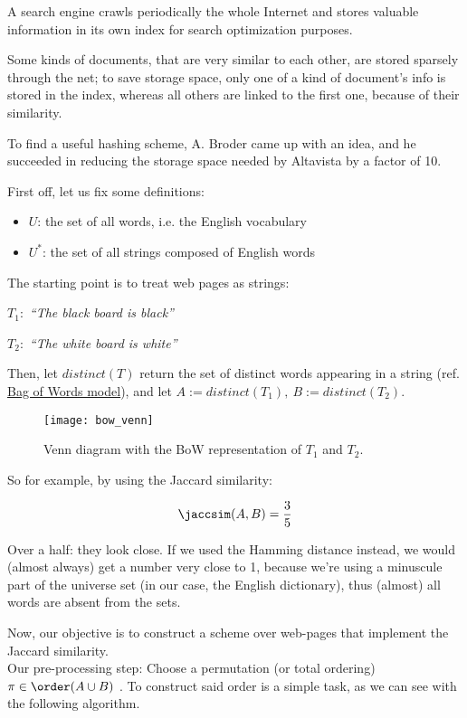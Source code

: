 A search engine crawls periodically the whole Internet and stores valuable information in its own index for search optimization purposes.

\begin{obs}
	Some kinds of documents, that are very similar to each other, are stored sparsely through the net; to save storage space, only one of a kind of document's info is stored in the index, whereas all others are linked to the first one, because of their similarity.
\end{obs}

To find a useful hashing scheme, A. Broder came up with an idea, and he succeeded in reducing the storage space needed by Altavista by a factor of 10.

First off, let us fix some definitions:
\begin{itemize}
\item $U$: the set of all words, i.e. the English vocabulary
\item $U^*$: the set of all strings composed of English words
\end{itemize}

The starting point is to treat web pages as strings:

$T_1:$ \textit{``The black board is black''}

$T_2:$ \textit{``The white board is white''}

Then, let $distinct(T)$ return the set of distinct words appearing in a string (ref. \href{https://en.wikipedia.org/wiki/Bag-of-words_model}{Bag of Words model}), and let $A:=distinct(T_1),\ B:=distinct(T_2)$.

\begin{figure}
	\centering
	\texttt{[image: bow\_venn]}
	\caption{Venn diagram with the BoW representation of $T_1$ and $T_2$.}
	\label{fig:bow_venn}
\end{figure}

So for example, by using the Jaccard similarity:

\begin{equation}
	\jaccsim(A, B)= \frac{3}{5}
\end{equation}

Over a half: they look close. If we used the Hamming distance instead, we would (almost always) get a number very close to 1, because we're using a minuscule part of the universe set (in our case, the English dictionary), thus (almost) all words are absent from the sets.

Now, our objective is to construct a scheme over web-pages that implement the Jaccard similarity.\\
Our pre-processing step: Choose a permutation (or total ordering) $\pi \in \order(A \cup B)$ \uar. To construct said order is a simple task, as we can see with the following algorithm.

